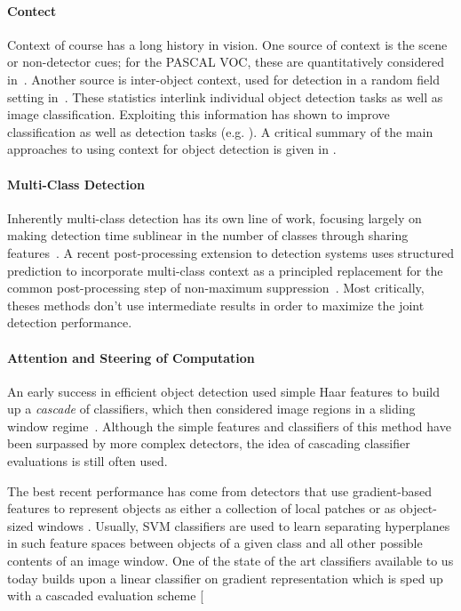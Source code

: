 \paragraph{Contect}
Context of course has a long history in vision.
One source of context is the scene or non-detector cues; for the PASCAL VOC, these are quantitatively considered in~\cite{Divvala2009}. 
Another source is inter-object context, used for detection in a random field setting in~\cite{Torralba2004}. These  statistics interlink individual object detection tasks as well as image classification. Exploiting this information has shown to improve classification as well as detection tasks (e.g. \cite{Torralba, visual phrases}).
A critical summary of the main approaches to using context for object detection is given in \cite{Galleguillos2010}.

\paragraph{Multi-Class Detection}
Inherently multi-class detection has its own line of work, focusing largely on making detection time sublinear in the number of classes through sharing features~\cite{Torralba2007,Fan2005,Razavi2011}.
A recent post-processing extension to detection systems uses structured prediction to incorporate multi-class context as a principled replacement for the common post-processing step of non-maximum suppression~\cite{Desai2009}. Most critically, theses methods don't use intermediate results in order to maximize the joint detection performance.

\paragraph{Attention and Steering of Computation}
An early success in efficient object detection used simple Haar features to build up a \emph{cascade} of classifiers, which then considered image regions in a sliding window regime~\cite{Viola2001}.
Although the simple features and classifiers of this method have been surpassed by more complex detectors, the idea of cascading classifier evaluations is still often used.

The best recent performance has come from detectors that use gradient-based features to represent objects as either a collection of local patches or as object-sized windows \cite{Dalal2005,Lowe2004}.
Usually, SVM classifiers are used to learn separating hyperplanes in such feature spaces between objects of a given class and all other possible contents of an image window. One of the state of the art classifiers available to us today builds upon a linear classifier on gradient representation which is sped up with a cascaded evaluation scheme \cite{DPM-cascade}[

